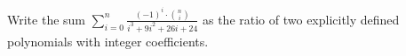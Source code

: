 Write the sum $\sum_{i=0}^{n}{\frac{(-1)^i\cdot\binom{n}{i}}{i^3 +9i^2 +26i +24}}$ as the ratio of two explicitly defined polynomials with integer coefficients.